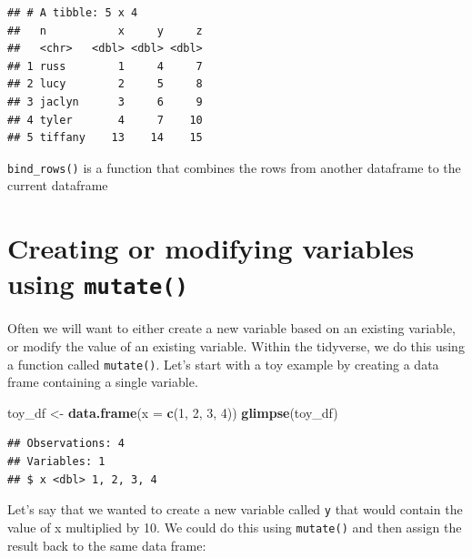\documentclass[12pt,]{book}
\newenvironment{Shaded}{\begin{snugshade}}{\end{snugshade}}
\newcommand{\CommentTok}[1]{\textcolor[rgb]{0.56,0.35,0.01}{\textit{#1}}}
\newcommand{\DataTypeTok}[1]{\textcolor[rgb]{0.13,0.29,0.53}{#1}}
\newcommand{\DecValTok}[1]{\textcolor[rgb]{0.00,0.00,0.81}{#1}}
\newcommand{\KeywordTok}[1]{\textcolor[rgb]{0.13,0.29,0.53}{\textbf{#1}}}
\newcommand{\NormalTok}[1]{#1}
\newcommand{\OperatorTok}[1]{\textcolor[rgb]{0.81,0.36,0.00}{\textbf{#1}}}
\newcommand{\StringTok}[1]{\textcolor[rgb]{0.31,0.60,0.02}{#1}}
\begin{document}
\begin{verbatim}
## # A tibble: 5 x 4
##   n           x     y     z
##   <chr>   <dbl> <dbl> <dbl>
## 1 russ        1     4     7
## 2 lucy        2     5     8
## 3 jaclyn      3     6     9
## 4 tyler       4     7    10
## 5 tiffany    13    14    15
\end{verbatim}

\texttt{bind\_rows()} is a function that combines the rows from another dataframe to the current dataframe

\hypertarget{creating-or-modifying-variables-using-mutate}{%
\section{\texorpdfstring{Creating or modifying variables using \texttt{mutate()}}{Creating or modifying variables using mutate()}}\label{creating-or-modifying-variables-using-mutate}}

Often we will want to either create a new variable based on an existing variable, or modify the value of an existing variable. Within the tidyverse, we do this using a function called \texttt{mutate()}. Let's start with a toy example by creating a data frame containing a single variable.

\begin{Shaded}
\begin{Highlighting}[]
\NormalTok{toy_df <-}\StringTok{ }\KeywordTok{data.frame}\NormalTok{(}\DataTypeTok{x =} \KeywordTok{c}\NormalTok{(}\DecValTok{1}\NormalTok{, }\DecValTok{2}\NormalTok{, }\DecValTok{3}\NormalTok{, }\DecValTok{4}\NormalTok{))}
\KeywordTok{glimpse}\NormalTok{(toy_df)}
\end{Highlighting}
\end{Shaded}

\begin{verbatim}
## Observations: 4
## Variables: 1
## $ x <dbl> 1, 2, 3, 4
\end{verbatim}

Let's say that we wanted to create a new variable called \texttt{y} that would contain the value of x multiplied by 10. We could do this using \texttt{mutate()} and then assign the result back to the same data frame:

\begin{Shaded}
\end{Shaded}
\end{document}

